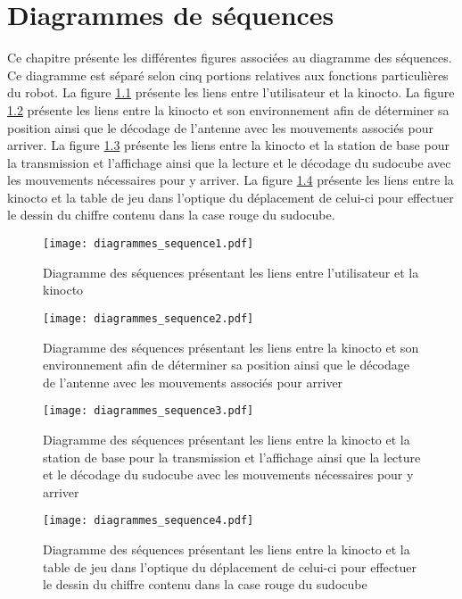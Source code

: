 


\chapter{Diagrammes de séquences}
\label{s:sequences}
Ce chapitre présente les différentes figures associées au diagramme des séquences. Ce diagramme est séparé selon cinq portions relatives aux fonctions particulières du robot. La figure \ref{fig:diagSeq1Ite1} présente les liens entre l'utilisateur et la kinocto. La figure \ref{diagSeq2Ite1} présente les liens entre la kinocto et son environnement afin de déterminer sa position ainsi que le décodage de l'antenne avec les mouvements associés pour arriver. La figure \ref{diagSeq3Ite1} présente les liens entre la kinocto et la station de base pour la transmission et l'affichage ainsi que la lecture et le décodage du sudocube avec les mouvements nécessaires pour y arriver. La figure \ref{diagSeq4Ite1} présente les liens entre la kinocto et la table de jeu dans l'optique du déplacement de celui-ci pour effectuer le dessin du chiffre contenu dans la case rouge du sudocube.
\begin{figure}[htb]
\centering
\texttt{[image: diagrammes\_sequence1.pdf]}
\caption{Diagramme des séquences présentant les liens entre l'utilisateur et la kinocto}
\label{fig:diagSeq1Ite1} 
\end{figure}

\begin{landscape}
\begin{figure}[htb]
\texttt{[image: diagrammes\_sequence2.pdf]}
\caption{Diagramme des séquences présentant les liens entre la kinocto et son environnement afin de déterminer sa position ainsi que le décodage de l'antenne avec les mouvements associés pour arriver}
\label{diagSeq2Ite1}
\end{figure}

\begin{figure}[htb]
\texttt{[image: diagrammes\_sequence3.pdf]}
\caption{Diagramme des séquences présentant les liens entre la kinocto et la station de base pour la transmission et l'affichage ainsi que la lecture et le décodage du sudocube avec les mouvements nécessaires pour y arriver}
\label{diagSeq3Ite1}
\end{figure}

\begin{figure}[htb]
	\texttt{[image: diagrammes\_sequence4.pdf]}
\caption{Diagramme des séquences présentant les liens entre la kinocto et la table de jeu dans l'optique du déplacement de celui-ci pour effectuer le dessin du chiffre contenu dans la case rouge du sudocube}
\label{diagSeq4Ite1}
\end{figure}

\end{landscape}
